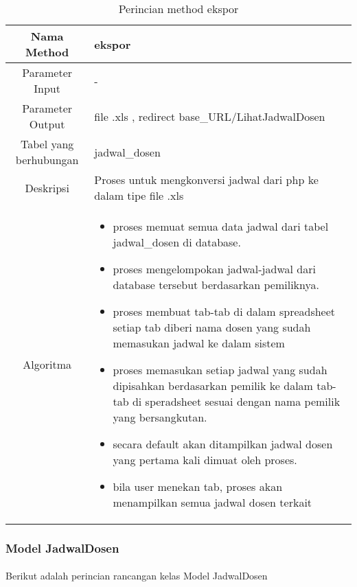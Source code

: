 \begin{center}
\begin{table}[H]
\caption{Perincian method ekspor}
\begin{tabular}{|c|p{11cm}|}
\hline
Nama Method 	& 	ekspor 	\\
\hline
Parameter Input & - \\
\hline
Parameter Output & file .xls , redirect base\_URL/LihatJadwalDosen \\
\hline
Tabel yang berhubungan & jadwal\_dosen \\
\hline
Deskripsi	& Proses untuk mengkonversi jadwal dari php ke dalam tipe file .xls \\
\hline
Algoritma	& \begin{itemize}
				\item proses memuat semua data jadwal dari tabel jadwal\_dosen di database.
				\item proses mengelompokan jadwal-jadwal dari database tersebut berdasarkan pemiliknya.
				\item proses membuat tab-tab di dalam spreadsheet setiap tab diberi nama dosen yang sudah memasukan jadwal ke dalam sistem
				\item proses memasukan setiap jadwal yang sudah dipisahkan berdasarkan pemilik ke dalam tab-tab di speradsheet sesuai dengan nama pemilik yang bersangkutan.
				\item secara default akan ditampilkan jadwal dosen yang pertama kali dimuat oleh proses.
				\item bila user menekan tab, proses akan menampilkan semua jadwal dosen terkait
				\end{itemize} \\
\hline
\end{tabular}
\end{table}
\end{center}


\subsubsection{Model JadwalDosen}
\paragraph{} Berikut adalah perincian rancangan kelas Model JadwalDosen

